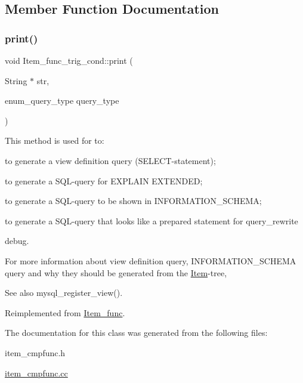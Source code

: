 \subsection{Member Function Documentation}
\mbox{\label{classItem__func__trig__cond_afa6900d80f97abb71f1e710c02d83d8a}} 
\subsubsection{\texorpdfstring{print()}{print()}}
{\footnotesize\ttfamily void Item\+\_\+func\+\_\+trig\+\_\+cond\+::print (\begin{DoxyParamCaption}\item[{String $\ast$}]{str,  }\item[{enum\+\_\+query\+\_\+type}]{query\+\_\+type }\end{DoxyParamCaption})\hspace{0.3cm}{\ttfamily [virtual]}}

This method is used for to\+:
\begin{DoxyItemize}
\item to generate a view definition query (S\+E\+L\+E\+CT-\/statement);
\item to generate a S\+QL-\/query for E\+X\+P\+L\+A\+IN E\+X\+T\+E\+N\+D\+ED;
\item to generate a S\+QL-\/query to be shown in I\+N\+F\+O\+R\+M\+A\+T\+I\+O\+N\+\_\+\+S\+C\+H\+E\+MA;
\item to generate a S\+QL-\/query that looks like a prepared statement for query\+\_\+rewrite
\item debug.
\end{DoxyItemize}

For more information about view definition query, I\+N\+F\+O\+R\+M\+A\+T\+I\+O\+N\+\_\+\+S\+C\+H\+E\+MA query and why they should be generated from the \mbox{\hyperlink{classItem}{Item}}-\/tree, \begin{DoxySeeAlso}{See also}
mysql\+\_\+register\+\_\+view(). 
\end{DoxySeeAlso}


Reimplemented from \mbox{\hyperlink{classItem__func_afb302ee25d4721ace27d3f5053d4ee41}{Item\+\_\+func}}.



The documentation for this class was generated from the following files\+:\begin{DoxyCompactItemize}
\item 
item\+\_\+cmpfunc.\+h\item 
\mbox{\hyperlink{item__cmpfunc_8cc}{item\+\_\+cmpfunc.\+cc}}\end{DoxyCompactItemize}
